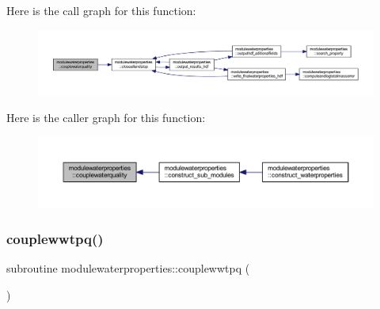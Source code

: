 Here is the call graph for this function\+:\nopagebreak
\begin{figure}[H]
\begin{center}
\leavevmode
\includegraphics[width=350pt]{namespacemodulewaterproperties_a2f489eed4fdde73d4aa3ecc3ac0f1ced_cgraph}
\end{center}
\end{figure}
Here is the caller graph for this function\+:\nopagebreak
\begin{figure}[H]
\begin{center}
\leavevmode
\includegraphics[width=350pt]{namespacemodulewaterproperties_a2f489eed4fdde73d4aa3ecc3ac0f1ced_icgraph}
\end{center}
\end{figure}
\mbox{\label{namespacemodulewaterproperties_a2c86f539e4715abad89dc127b5f17d20}} 
\subsubsection{\texorpdfstring{couplewwtpq()}{couplewwtpq()}}
{\footnotesize\ttfamily subroutine modulewaterproperties\+::couplewwtpq (\begin{DoxyParamCaption}{ }\end{DoxyParamCaption})\hspace{0.3cm}{\ttfamily [private]}}

